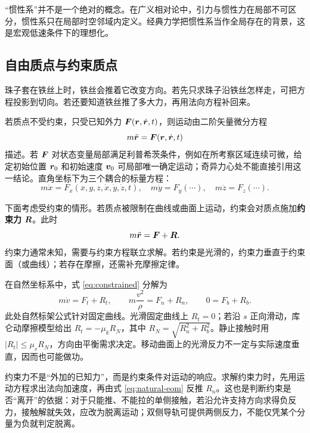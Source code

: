 \begin{modernbox}
“惯性系”并不是一个绝对的概念。在广义相对论中，引力与惯性力在局部不可区分，惯性系只在局部时空邻域内定义。经典力学把惯性系当作全局存在的背景，这是宏观低速条件下的理想化。
\end{modernbox}


\subsection{自由质点与约束质点}

珠子套在铁丝上时，铁丝会推着它改变方向。若先只求珠子沿铁丝怎样走，可把方程投影到切向。若还要知道铁丝推了多大力，再用法向方程补回来。

若质点不受约束，只受已知外力 $\boldsymbol{F}(\boldsymbol{r},\dot{\boldsymbol{r}},t)$，则运动由二阶矢量微分方程
\begin{equation}
m\ddot{\boldsymbol{r}}=\boldsymbol{F}(\boldsymbol{r},\dot{\boldsymbol{r}},t)
\label{eq:free-particle}
\end{equation}
描述。若 $\boldsymbol{F}$ 对状态变量局部满足利普希茨条件，例如在所考察区域连续可微，给定初始位置 $\boldsymbol{r}_0$ 和初始速度 $\boldsymbol{v}_0$ 可局部唯一确定运动；奇异力心处不能直接引用这一结论。直角坐标下为三个耦合的标量方程：
\begin{equation}
m\ddot x=F_x(x,y,z,\dot x,\dot y,\dot z,t),\quad
m\ddot y=F_y(\cdots),\quad
m\ddot z=F_z(\cdots).
\end{equation}

下面考虑受约束的情形。若质点被限制在曲线或曲面上运动，约束会对质点施加\textbf{约束力} $\boldsymbol{R}$。此时
\begin{equation}
m\ddot{\boldsymbol{r}}=\boldsymbol{F}+\boldsymbol{R} .
\label{eq:constrained}
\end{equation}
约束力通常未知，需要与约束方程联立求解。若约束是光滑的，约束力垂直于约束面（或曲线）；若存在摩擦，还需补充摩擦定律。

在自然坐标系中，式 \eqref{eq:constrained} 分解为
\begin{equation}
m\dot v=F_t+R_t,\qquad
m\frac{v^2}{\rho}=F_n+R_n,\qquad
0=F_b+R_b .
\label{eq:natural-eom}
\end{equation}
此处自然标架公式针对固定曲线。光滑固定曲线上 $R_t=0$；若沿 $s$ 正向滑动，库仑动摩擦模型给出 $R_t=-\mu_k R_N$，其中 $R_N=\sqrt{R_n^2+R_b^2}$。静止接触时用 $|R_t|\le\mu_s R_N$，方向由平衡需求决定。移动曲面上的光滑反力不一定与实际速度垂直，因而也可能做功。

\begin{physicsbox}
约束力不是“外加的已知力”，而是约束条件对运动的响应。求解约束力时，先用运动方程求出法向加速度，再由式 \eqref{eq:natural-eom} 反推 $R_n$。这也是判断约束是否“离开”的依据：对于只能推、不能拉的单侧接触，若沿允许支持方向求得负反力，接触解就失效，应改为脱离运动；双侧导轨可提供两侧反力，不能仅凭某个分量为负就判定脱离。
\end{physicsbox}

